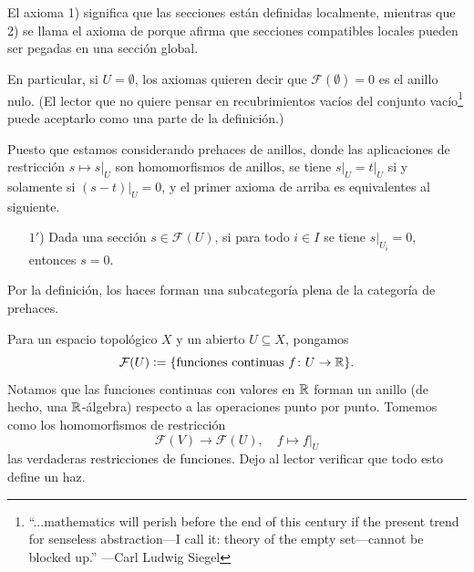 \documentclass{article}
\numberwithin{equation}{section}
\theoremstyle{definition}
\begin{document}
\vspace{1em}

El axioma 1) significa que las secciones están definidas localmente, mientras
que 2) se llama el axioma de  porque afirma que secciones
compatibles locales pueden ser pegadas en una sección global.

\begin{comentario}
  En particular, si $U = \emptyset$, los axiomas quieren decir que
  $\mathcal{F} (\emptyset) = 0$ es el anillo nulo. (El lector que no quiere
  pensar en recubrimientos vacíos del conjunto vacío\footnote{``...mathematics
    will perish before the end of this century if the present trend for
    senseless abstraction---I call it: theory of the empty set---cannot be
    blocked up.'' ---Carl Ludwig Siegel} puede aceptarlo como una parte
  de la definición.)
\end{comentario}

\begin{comentario}
  \label{com:primer-axioma-seccion-nula}
  Puesto que estamos considerando prehaces de anillos, donde las aplicaciones
  de restricción $s \mapsto \left.s\right|_U$ son homomorfismos de anillos,
  se tiene $\left.s\right|_U = \left.t\right|_U$ si y solamente si
  $\left.(s-t)\right|_U = 0$, y el primer axioma de arriba es equivalentes
  al siguiente.
  \begin{enumerate}
  \item[$1'$)] Dada una sección $s \in \mathcal{F} (U)$, si para todo $i\in I$
    se tiene $\left.s\right|_{U_i} = 0$, entonces $s = 0$.
  \end{enumerate}
\end{comentario}

Por la definición, los haces forman una subcategoría plena de la categoría
de prehaces.

\begin{ejemplo}
  Para un espacio topológico $X$ y un abierto $U \subseteq X$, pongamos
  $$\mathcal{F} (U) \mathrel{\mathop:}= \{ \text{funciones continuas } f\colon U\to \mathbb{R} \}.$$
  Notamos que las funciones continuas con valores en $\mathbb{R}$ forman un anillo
  (de hecho, una $\mathbb{R}$-álgebra) respecto a las operaciones punto por
  punto. Tomemos como los homomorfismos de restricción
  $$\mathcal{F} (V) \to \mathcal{F} (U), \quad f \mapsto \left.f\right|_U$$
  las verdaderas restricciones de funciones. Dejo al lector verificar que todo
  esto define un haz.
\end{ejemplo}
\end{document}
